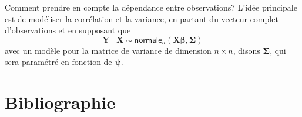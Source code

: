 \documentclass[
  11pt,
  letterpaper,
]{scrbook}
\theoremstyle{definition}
\theoremstyle{definition}
\theoremstyle{plain}
\theoremstyle{plain}
\theoremstyle{remark}
\begin{document}
Comment prendre en compte la dépendance entre observations? L'idée
principale est de modéliser la corrélation et la variance, en partant du
vecteur complet d'observations et en supposant que
\[\boldsymbol{Y} \mid \mathbf{X} \sim \mathsf{normale}_n(\mathbf{X}\boldsymbol{\beta}, \boldsymbol{\Sigma})\]
avec un modèle pour la matrice de variance de dimension \(n \times n\),
disons \(\boldsymbol{\Sigma}\), qui sera paramétré en fonction de
\(\boldsymbol{\psi}\).


\chapter*{Bibliographie}\label{bibliographie}

\end{document}
